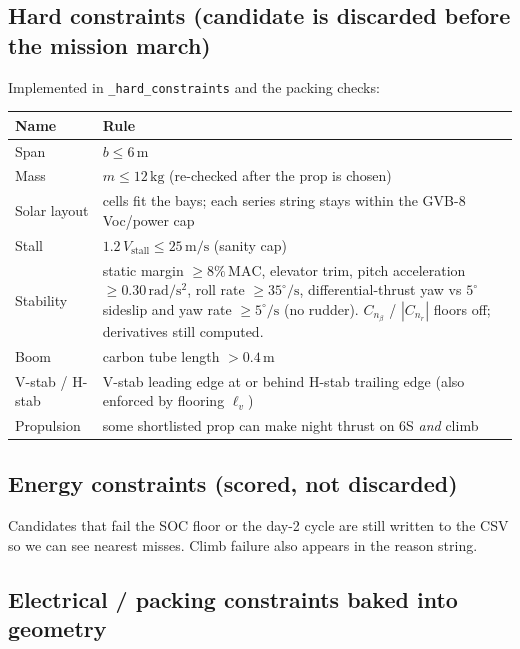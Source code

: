 \documentclass[11pt,letterpaper]{article}
\newcommand{\code}[1]{\texttt{#1}}
\begin{document}
\subsection{Hard constraints (candidate is discarded before the mission march)}

Implemented in \code{\_hard\_constraints} and the packing checks:

\begin{center}
\begin{tabular}{@{}lp{}@{}}
\toprule
Name & Rule \\
\midrule
Span & $b \le 6\,\mathrm{m}$ \\
Mass & $m \le 12\,\mathrm{kg}$ (re-checked after the prop is chosen) \\
Solar layout & cells fit the bays; each series string stays within the GVB-8 Voc/power cap \\
Stall & $1.2\,V_\mathrm{stall} \le 25\,\mathrm{m/s}$ (sanity cap) \\
Stability & static margin $\ge 8\%\,\mathrm{MAC}$, elevator trim, pitch acceleration $\ge 0.30\,\mathrm{rad/s^2}$, roll rate $\ge 35^\circ/\mathrm{s}$, differential-thrust yaw vs $5^\circ$ sideslip and yaw rate $\ge 5^\circ/\mathrm{s}$ (no rudder). $C_{n_\beta}$ / $|C_{n_r}|$ floors off; derivatives still computed. \\
Boom & carbon tube length $> 0.4\,\mathrm{m}$ \\
V-stab / H-stab & V-stab leading edge at or behind H-stab trailing edge (also enforced by flooring $\ell_v$) \\
Propulsion & some shortlisted prop can make night thrust on 6S \emph{and} climb \\
\bottomrule
\end{tabular}
\end{center}

\subsection{Energy constraints (scored, not discarded)}

Candidates that fail the SOC floor or the day-2 cycle are still written to the CSV so we can see nearest misses. Climb failure also appears in the reason string.

\subsection{Electrical / packing constraints baked into geometry}
\end{document}
